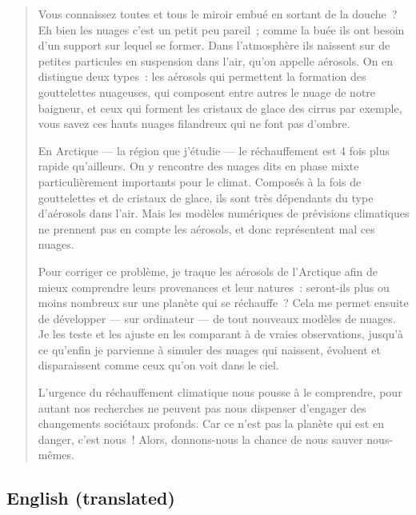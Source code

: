 \begin{quote}
    Vous connaissez toutes et tous le miroir embué en sortant de la douche ? Eh bien les nuages c’est un petit peu pareil ; comme la buée ils ont besoin d’un support sur lequel se former. Dans l’atmosphère ils naissent sur de petites particules en suspension dans l’air, qu’on appelle aérosols.
    On en distingue deux types : les aérosols qui permettent la formation des gouttelettes nuageuses, qui composent entre autres le nuage de notre baigneur, et ceux qui forment les cristaux de glace des cirrus par exemple, vous savez ces hauts nuages filandreux qui ne font pas d’ombre.\
    
    En Arctique — la région que j’étudie — le réchauffement est 4 fois plus rapide qu’ailleurs. On y rencontre des nuages dits en phase mixte particulièrement importants pour le climat. Composés à la fois de gouttelettes et de cristaux de glace, ils sont très dépendants du type d’aérosols dans l’air. Mais  les modèles numériques de prévisions climatiques ne prennent pas en compte les aérosols, et donc représentent mal ces nuages.\
    
    Pour corriger ce problème, je traque les aérosols de l’Arctique afin de mieux comprendre leurs provenances et leur natures : seront-ils plus ou moins nombreux sur une planète qui se réchauffe ?  Cela me permet ensuite de développer — sur ordinateur — de tout nouveaux modèles de nuages. Je les teste et les ajuste en les comparant à de vraies observations, jusqu’à ce qu’enfin je parvienne à simuler des nuages qui naissent, évoluent et disparaissent comme ceux qu’on voit dans le ciel.\
    
    L’urgence du réchauffement climatique nous pousse à le comprendre, pour autant nos recherches ne peuvent pas nous dispenser d’engager des changements sociétaux profonds. Car ce n’est pas la planète qui est en danger, c’est nous ! Alors, donnons-nous la chance de nous sauver nous-mêmes.
\end{quote} 

    \subsection*{English (translated)}
    
